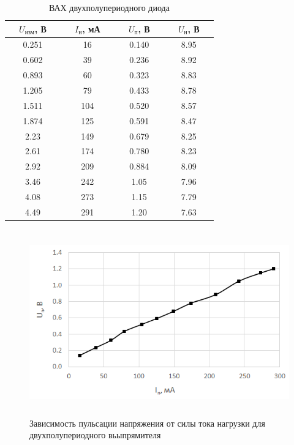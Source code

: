 \begin{table}[H]
	\begin{center}
	\caption{ВАХ двухполупериодного диода}
	\def\arraystretch{1.4}
		\begin{tabular}{|c|c|c|c|}
		\hline 
		\ \ $U_\text{изм}$, В\ \  & \ \ $I_\text{н}$, мА\ \  & \ \ $U_\text{п}$, В\ \  & \ \ $U_\text{н}$, В\ \  \\ \hline
		0.251 & 16 & 0.140 & 8.95 \\ \hline
		0.602 & 39 & 0.236 & 8.92 \\ \hline
		0.893 & 60 & 0.323 & 8.83 \\ \hline
		1.205 & 79 & 0.433 & 8.78 \\ \hline
		1.511 & 104 & 0.520 & 8.57 \\ \hline
		1.874 & 125 & 0.591 & 8.47 \\ \hline
		2.23 & 149 & 0.679 & 8.25 \\ \hline
		2.61 & 174 & 0.780 & 8.23 \\ \hline
		2.92 & 209 & 0.884 & 8.09 \\ \hline
		3.46 & 242 & 1.05 & 7.96 \\ \hline
		4.08 & 273 & 1.15 & 7.79 \\ \hline
		4.49 & 291 & 1.20 & 7.63 \\ \hline
		\end{tabular} 
		\label{tab:5:3}
	\end{center}
\end{table}

\begin{figure}[H]
	\begin{center}
		\includegraphics[width=15cm,height=8cm]{img/4}
		\caption{Зависимость пульсации напряжения от силы тока нагрузки для двухполупериодного вьыпрямителя}
		\label{g:4} %
	\end{center}
\end{figure}

